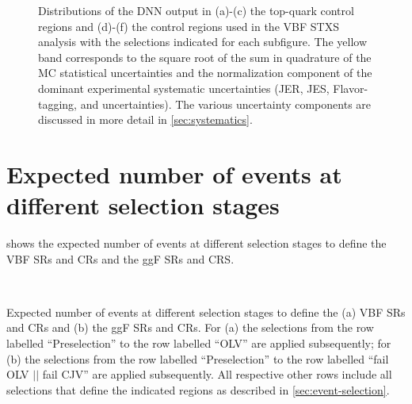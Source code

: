 \begin{figure}[h!]
{        }
        \caption[Distributions of the DNN output in the control regions used in the VBF STXS analysis.]{
            Distributions of the DNN output in (a)-(c) the top-quark control regions and (d)-(f) the \Ztautau control regions used in the VBF STXS analysis with the selections indicated for each subfigure. The yellow band corresponds to the square root of the sum in quadrature of the MC statistical uncertainties and the normalization component of the dominant experimental systematic uncertainties (JER, JES, Flavor-tagging, and \MET uncertainties). The various uncertainty components are discussed in more detail in \cref{sec:systematics}.}
        \label{app:fig:dnn-output-vbf-stxs}
    \end{figure}

    \FloatBarrier
    \section{Expected number of events at different selection stages}
    \label{app:cutflows}

     shows the expected number of events at different selection stages to define the VBF \TwoJet SRs and CRs and the ggF \TwoJet SRs and CRS.

    \begin{landscape}
        \thispagestyle{empty}
        \begin{table}
            \subfloat[]{
                \resizebox{\textwidth}{!}{
                    
                }
            } \\
            \vspace{20pt}
            \subfloat[]{
                \resizebox{\textwidth}{!}{
                    
                }
            }
            \caption[Expected number of events at different selection stages.]{Expected number of events at different selection stages to define the (a) VBF \TwoJet SRs and CRs and (b) the ggF \TwoJet SRs and CRs. For (a) the selections from the row labelled ``Preselection'' to the row labelled ``OLV'' are applied subsequently; for (b) the selections from the row labelled ``Preselection'' to the row labelled ``fail OLV $||$ fail CJV'' are applied subsequently. All respective other rows include all selections that define the indicated regions as described in \cref{sec:event-selection}.}
            \label{app:tab:cutflows}
        \end{table}
    \end{landscape}

